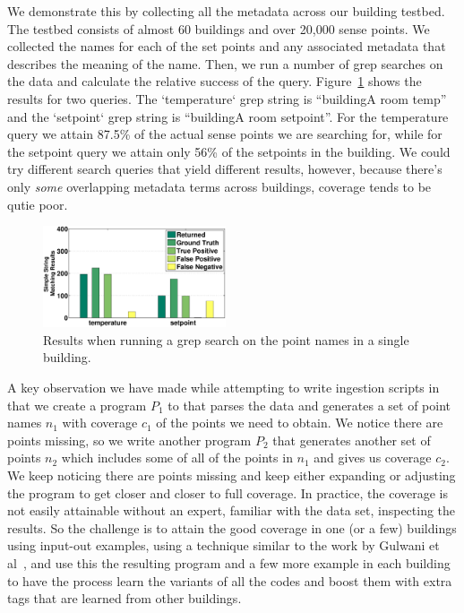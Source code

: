 We demonstrate this by collecting all the metadata across our building
testbed.  The testbed consists of almost 60 buildings and over 20,000 sense points.  We collected
the names for each of the set points and any associated metadata that describes the meaning
of the name.  Then, we run a number of grep searches on the data and calculate the 
relative success of the query.  Figure~\ref{fig:sodagrep} shows the results for two queries.
The `temperature` grep string is ``buildingA room temp'' and the `setpoint` grep string
is ``buildingA room setpoint''.  For the temperature query we attain 87.5\% of the 
actual sense points we are searching for, while for the setpoint query we attain only 56\%
of the setpoints in the building.  We could try different search queries that yield different
results, however, because there's only \emph{some} overlapping metadata terms across
buildings, coverage tends to be qutie poor.

\begin{figure}[h!]
\centering
    \includegraphics[width=0.48\textwidth]{figs/soda_grep_result.eps}
    \caption{Results when running a grep search on the point names in a single building.}
\label{fig:sodagrep}
\end{figure}

A key observation we have made while attempting to write ingestion scripts in that 
we create a program $P_{1}$ to that parses the data and generates a set of point names
$n_{1}$ with coverage $c_{1}$ of the points we need to obtain.  We notice there are
points missing, so we write another program $P_{2}$ that generates another set of points
$n_{2}$ which includes some of all of the points in $n_{1}$ and gives us coverage $c_{2}$.
We keep noticing there are points missing and keep either expanding or adjusting
the program to get closer and closer to full coverage.  In practice, the coverage is not
easily attainable without an expert, familiar with the data set, inspecting the results.
So the challenge is to attain the good coverage in one (or a few) buildings using input-out
examples, using a technique similar
to the work by Gulwani et al~\cite{Gulwani:2011}, and use this the resulting program and
a few more example in each building to have the process learn the variants of all the codes
and boost them with extra tags that are learned from other buildings.

